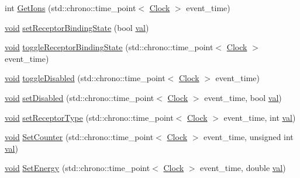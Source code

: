 \begin{DoxyCompactItemize}
\item 
int \mbox{\hyperlink{class_membrane_channel_af20c4ca6a3708c86122e7118a29952fd}{Get\+Ions}} (std\+::chrono\+::time\+\_\+point$<$ \mbox{\hyperlink{universe_8h_a0ef8d951d1ca5ab3cfaf7ab4c7a6fd80}{Clock}} $>$ event\+\_\+time)
\item 
\mbox{\hyperlink{glad_8h_a950fc91edb4504f62f1c577bf4727c29}{void}} \mbox{\hyperlink{class_membrane_channel_a9f5c69ab1f4dce6113fceebaaa4f15f4}{set\+Receptor\+Binding\+State}} (bool \mbox{\hyperlink{glad_8h_a26942fd2ed566ef553eae82d2c109c8f}{val}})
\item 
\mbox{\hyperlink{glad_8h_a950fc91edb4504f62f1c577bf4727c29}{void}} \mbox{\hyperlink{class_membrane_channel_a289ec477e64eec5d2a1f88f4a677650c}{toggle\+Receptor\+Binding\+State}} (std\+::chrono\+::time\+\_\+point$<$ \mbox{\hyperlink{universe_8h_a0ef8d951d1ca5ab3cfaf7ab4c7a6fd80}{Clock}} $>$ event\+\_\+time)
\item 
\mbox{\hyperlink{glad_8h_a950fc91edb4504f62f1c577bf4727c29}{void}} \mbox{\hyperlink{class_membrane_channel_aabbadec31782704dd497848154dfe0fc}{toggle\+Disabled}} (std\+::chrono\+::time\+\_\+point$<$ \mbox{\hyperlink{universe_8h_a0ef8d951d1ca5ab3cfaf7ab4c7a6fd80}{Clock}} $>$ event\+\_\+time)
\item 
\mbox{\hyperlink{glad_8h_a950fc91edb4504f62f1c577bf4727c29}{void}} \mbox{\hyperlink{class_membrane_channel_aed2055857888506a35c09bdcc265799a}{set\+Disabled}} (std\+::chrono\+::time\+\_\+point$<$ \mbox{\hyperlink{universe_8h_a0ef8d951d1ca5ab3cfaf7ab4c7a6fd80}{Clock}} $>$ event\+\_\+time, bool \mbox{\hyperlink{glad_8h_a26942fd2ed566ef553eae82d2c109c8f}{val}})
\item 
\mbox{\hyperlink{glad_8h_a950fc91edb4504f62f1c577bf4727c29}{void}} \mbox{\hyperlink{class_membrane_channel_a7f40594845bb0aa6a03fd9c08a836d7e}{set\+Receptor\+Type}} (std\+::chrono\+::time\+\_\+point$<$ \mbox{\hyperlink{universe_8h_a0ef8d951d1ca5ab3cfaf7ab4c7a6fd80}{Clock}} $>$ event\+\_\+time, int \mbox{\hyperlink{glad_8h_a26942fd2ed566ef553eae82d2c109c8f}{val}})
\item 
\mbox{\hyperlink{glad_8h_a950fc91edb4504f62f1c577bf4727c29}{void}} \mbox{\hyperlink{class_membrane_channel_a61931feff8f3bb485eeb5c80125bb732}{Set\+Counter}} (std\+::chrono\+::time\+\_\+point$<$ \mbox{\hyperlink{universe_8h_a0ef8d951d1ca5ab3cfaf7ab4c7a6fd80}{Clock}} $>$ event\+\_\+time, unsigned int \mbox{\hyperlink{glad_8h_a26942fd2ed566ef553eae82d2c109c8f}{val}})
\item 
\mbox{\hyperlink{glad_8h_a950fc91edb4504f62f1c577bf4727c29}{void}} \mbox{\hyperlink{class_membrane_channel_aaa2d816d3887b6292d995a83130a4834}{Set\+Energy}} (std\+::chrono\+::time\+\_\+point$<$ \mbox{\hyperlink{universe_8h_a0ef8d951d1ca5ab3cfaf7ab4c7a6fd80}{Clock}} $>$ event\+\_\+time, double \mbox{\hyperlink{glad_8h_a26942fd2ed566ef553eae82d2c109c8f}{val}})

\end{DoxyCompactItemize}
